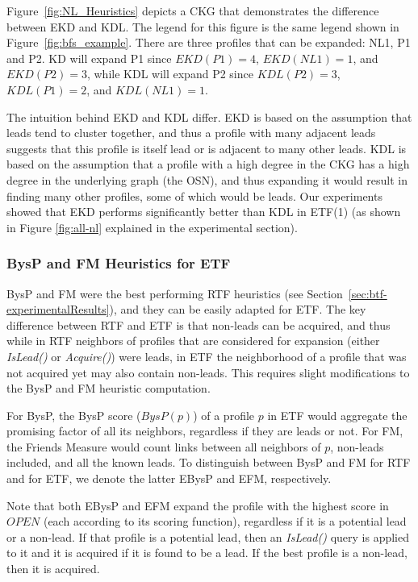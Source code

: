 \documentclass[journal]{IEEEtran}
\newcommand{\islead}[1]{{\em IsLead(#1)}}
\newcommand{\acquire}[1]{{\em Acquire(#1)}}
\begin{document}
Figure~\ref{fig:NL_Heuristics} depicts a CKG that demonstrates the difference between EKD and KDL. The legend for this figure is the same legend shown in Figure~\ref{fig:bfs_example}. There are three profiles that can be
expanded: NL1, P1 and P2. KD will expand P1 since $EKD(P1)=4$, $EKD(NL1)=1$, and
$EKD(P2)=3$, while KDL will expand P2 since $KDL(P2)=3$, $KDL(P1)=2$, and
$KDL(NL1)=1$.


The intuition behind EKD and KDL differ. EKD is based on the assumption that
leads tend to cluster together, and thus a profile with many adjacent leads
suggests that this profile is itself lead or is adjacent to many other leads.
KDL is based on the assumption that a profile with a high degree in the CKG has
a high degree in the underlying graph (the OSN), and thus expanding it would
result in finding many other profiles, some of which would be leads.
Our experiments showed that EKD performs significantly better than
KDL in ETF(1) (as shown in Figure \ref{fig:all-nl} explained in the
experimental section).

\subsubsection{BysP and FM Heuristics for ETF}



BysP and FM were the best performing RTF heuristics (see Section~\ref{sec:btf-experimentalResults}), and they can be easily adapted for ETF. The key difference between RTF and ETF is that non-leads can be acquired, and thus while in RTF neighbors of profiles that are considered for expansion (either \islead{} or \acquire{}) were leads, in ETF the neighborhood of a profile that was not acquired yet may also contain non-leads. This requires slight modifications to the BysP and FM heuristic computation. 

For BysP, the BysP score ($BysP(p)$) of a profile $p$ in ETF would aggregate the promising factor of all its neighbors, regardless if they are leads or not. For FM, the Friends Measure would count links between all neighbors of $p$, non-leads included, and all the known leads. To distinguish between BysP and FM for RTF and for ETF, we denote the latter EBysP and EFM, respectively.

Note that both EBysP and EFM expand the profile with the highest score in $OPEN$ (each according to its scoring function), regardless if it is a potential lead or a non-lead. If that profile is a potential lead, then an \islead{} query is applied to it and it is acquired if it is found to be a lead. If the best profile is a non-lead, then it is acquired. 
\end{document}
